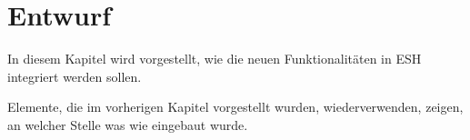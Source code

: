 \chapter{Entwurf}
\label{chap:entwurf}
In diesem Kapitel wird vorgestellt, wie die neuen Funktionalitäten in ESH integriert werden sollen.

Elemente, die im vorherigen Kapitel vorgestellt wurden, wiederverwenden, zeigen, an welcher Stelle was wie eingebaut wurde.



